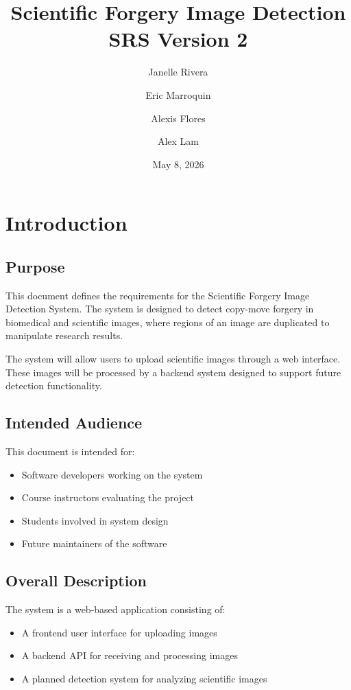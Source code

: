 \documentclass[12pt]{article}
\title{Scientific Forgery Image Detection\\SRS Version 2}
\author{Janelle Rivera \and Eric Marroquin \and Alexis Flores \and Alex Lam}
\date{May 8, 2026}
\begin{document}
\maketitle

\tableofcontents
\newpage

\section{Introduction}

\subsection{Purpose}

This document defines the requirements for the Scientific Forgery Image Detection
System. The system is designed to detect copy-move forgery in biomedical and
scientific images, where regions of an image are duplicated to manipulate research
results.

The system will allow users to upload scientific images through a web interface. These
images will be processed by a backend system designed to support future detection
functionality.

\subsection{Intended Audience}

This document is intended for:

\begin{itemize}
    \item Software developers working on the system
    \item Course instructors evaluating the project
    \item Students involved in system design
    \item Future maintainers of the software
\end{itemize}

\subsection{Overall Description}

The system is a web-based application consisting of:

\begin{itemize}
    \item A frontend user interface for uploading images
    \item A backend API for receiving and processing images
    \item A planned detection system for analyzing scientific images
\end{itemize}
\end{document}
